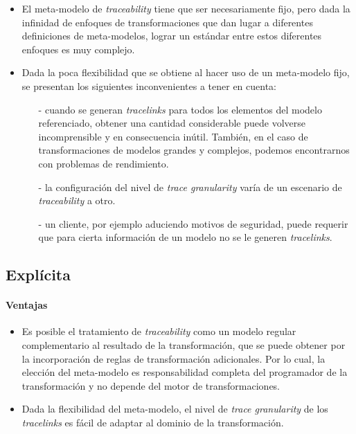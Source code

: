 \documentclass[a4paper,12pt,oneside,spanish]{book}
\begin{document}
\begin{itemize}[label={$\times$}]

\item El meta-modelo de \textit{traceability} tiene que ser necesariamente fijo, pero dada la infinidad de enfoques de transformaciones que dan lugar a diferentes definiciones de meta-modelos, lograr un estándar entre estos diferentes enfoques es muy complejo.

\item Dada la poca flexibilidad que se obtiene al hacer uso de un meta-modelo fijo, se presentan los siguientes inconvenientes a tener en cuenta:

\begin{itemize}

\item[-] cuando se generan \textit{tracelinks} para todos los elementos del modelo referenciado, obtener una cantidad considerable puede volverse incomprensible y en consecuencia inútil. También, en el caso de transformaciones de modelos grandes y complejos, podemos encontrarnos con problemas de rendimiento.

\item[-] la configuración del nivel de \textit{trace granularity} varía de un escenario de \textit{traceability} a otro.

\item[-] un cliente, por ejemplo aduciendo motivos de seguridad, puede requerir que para cierta información de un modelo no se le generen \textit{tracelinks}.

\end{itemize}

\end{itemize}

\subsection{Explícita}

\paragraph{Ventajas}

\begin{itemize}[label={\checkmark}]

\item Es posible el tratamiento de \textit{traceability} como un modelo regular complementario al resultado de la transformación, que se puede obtener por la incorporación de reglas de transformación adicionales. Por lo cual, la elección del meta-modelo es responsabilidad completa del programador de la transformación y no depende del motor de transformaciones. 

\item Dada la flexibilidad del meta-modelo, el nivel de \textit{trace granularity} de los \textit{tracelinks} es fácil de adaptar al dominio de la transformación.

\end{itemize}
\end{document}
